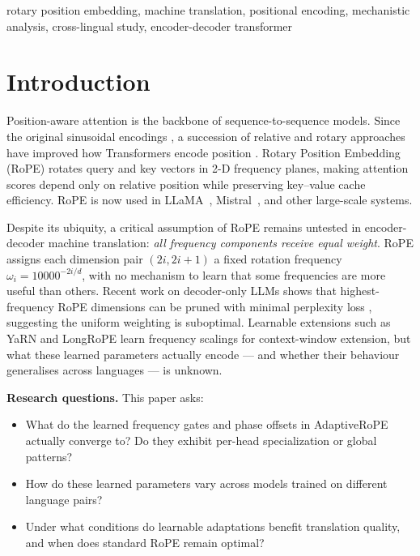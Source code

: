 \documentclass[conference]{IEEEtran}
\begin{document}
\begin{IEEEkeywords}
rotary position embedding, machine translation, positional encoding,
mechanistic analysis, cross-lingual study, encoder-decoder transformer
\end{IEEEkeywords}

\section{Introduction}
\label{sec:intro}

Position-aware attention is the backbone of sequence-to-sequence models.
Since the original sinusoidal encodings \cite{vaswani2017attention}, a
succession of relative and rotary approaches have improved how Transformers
encode position \cite{shaw2018self,raffel2020exploring,su2021roformer}.
Rotary Position Embedding (RoPE) \cite{su2021roformer} rotates query and key
vectors in 2-D frequency planes, making attention scores depend only on
relative position while preserving key--value cache efficiency. RoPE is now
used in LLaMA~\cite{touvron2023llama}, Mistral~\cite{jiang2023mistral}, and
other large-scale systems.

Despite its ubiquity, a critical assumption of RoPE remains untested in
encoder-decoder machine translation: \emph{all frequency components receive
equal weight}. RoPE assigns each dimension pair $(2i, 2i{+}1)$ a fixed
rotation frequency $\omega_i = 10000^{-2i/d}$, with no mechanism to learn
that some frequencies are more useful than others. Recent work on decoder-only
LLMs shows that highest-frequency RoPE dimensions can be pruned with minimal
perplexity loss \cite{men2024roundandround}, suggesting the uniform weighting
is suboptimal. Learnable extensions such as YaRN \cite{peng2023yarn} and
LongRoPE \cite{ding2024longrope} learn frequency scalings for context-window
extension, but what these learned parameters actually encode --- and whether
their behaviour generalises across languages --- is unknown.

\textbf{Research questions.} This paper asks:
\begin{itemize}
  \item[\textbf{RQ1}] What do the learned frequency gates and phase offsets
        in AdaptiveRoPE actually converge to? Do they exhibit per-head
        specialization or global patterns?
  \item[\textbf{RQ2}] How do these learned parameters vary across models
        trained on different language pairs?
  \item[\textbf{RQ3}] Under what conditions do learnable adaptations benefit
        translation quality, and when does standard RoPE remain optimal?
\end{itemize}
\end{document}
